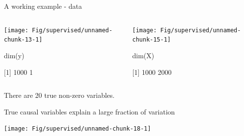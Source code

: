 \documentclass[
  ignorenonframetext,
  aspectratio=169]{beamer}
\newenvironment{Shaded}{\begin{snugshade}}{\end{snugshade}}
\newcommand{\AttributeTok}[1]{\textcolor[rgb]{0.77,0.63,0.00}{#1}}
\newcommand{\ConstantTok}[1]{\textcolor[rgb]{0.00,0.00,0.00}{#1}}
\newcommand{\DecValTok}[1]{\textcolor[rgb]{0.00,0.00,0.81}{#1}}
\newcommand{\FunctionTok}[1]{\textcolor[rgb]{0.00,0.00,0.00}{#1}}
\newcommand{\NormalTok}[1]{#1}
\newcommand{\OtherTok}[1]{\textcolor[rgb]{0.56,0.35,0.01}{#1}}
\newcommand{\SpecialCharTok}[1]{\textcolor[rgb]{0.00,0.00,0.00}{#1}}
\begin{document}
\begin{frame}[fragile]{A working example - data}
\protect\hypertarget{a-working-example---data}{}
\begin{columns}[T]
\begin{column}{.45\textwidth}
\scriptsize

\begin{center}\texttt{[image: Fig/supervised/unnamed-chunk-13-1]} \end{center}

\normalsize

\scriptsize

\begin{Shaded}
\begin{Highlighting}[]
\FunctionTok{dim}\NormalTok{(y)}
\end{Highlighting}
\end{Shaded}

{[}1{]} 1000 1

\normalsize
\end{column}

\begin{column}{.45\textwidth}
\scriptsize

\begin{center}\texttt{[image: Fig/supervised/unnamed-chunk-15-1]} \end{center}

\normalsize

\scriptsize

\begin{Shaded}
\begin{Highlighting}[]
\FunctionTok{dim}\NormalTok{(X)}
\end{Highlighting}
\end{Shaded}

{[}1{]} 1000 2000

\normalsize
\end{column}
\end{columns}

There are 20 true non-zero variables.
\end{frame}

\begin{frame}[fragile]{True causal variables explain a large fraction of
variation}
\protect\hypertarget{true-causal-variables-explain-a-large-fraction-of-variation}{}
\scriptsize

\begin{Shaded}
\end{Shaded}

\normalsize

\scriptsize

\begin{center}\texttt{[image: Fig/supervised/unnamed-chunk-18-1]} \end{center}

\normalsize
\end{frame}
\end{document}
